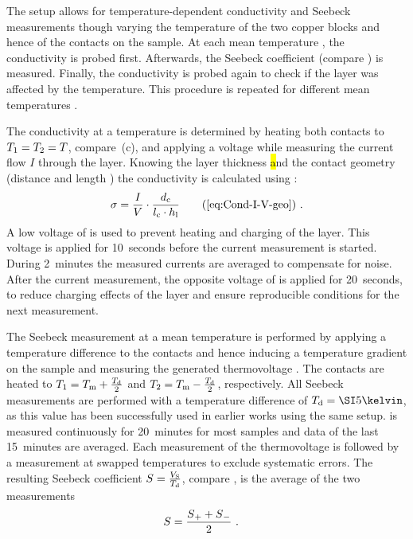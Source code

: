 The setup allows for temperature-dependent conductivity and Seebeck measurements though varying the temperature of the two copper blocks and hence of the contacts on the sample.
At each mean temperature \Tm, the conductivity is probed first. Afterwards, the Seebeck coefficient (compare ) is measured. Finally, the conductivity is probed again to check if the layer was affected by the temperature. This procedure is repeated for different mean temperatures \Tm.

The conductivity at a temperature \T is determined by heating both contacts to \mbox{$T_1=T_2=\T$}, compare \,(c), and applying a voltage \V while measuring the current flow $I$ through the layer. Knowing the layer thickness \hl and the contact geometry (distance \dc and length \lc) the conductivity is calculated using :
\begin{align}
\c = \frac{I}{V} \cdot \frac{\dc}{\lc\cdot\hl}
\tag{\ref{eq:Cond-I-V-geo}}
\PUNKT
\end{align}
A low voltage of \V[1] is used to prevent heating and charging of the layer. This voltage is applied for 10~seconds before the current measurement is started. During 2~minutes the measured currents are averaged to compensate for noise. After the current measurement, the opposite voltage of \V[-1] is applied for 20~seconds, to reduce charging effects of the layer and ensure reproducible conditions for the next measurement.

The Seebeck measurement at a mean temperature \Tm is performed by applying a temperature difference \Td to the contacts and hence inducing a temperature gradient on the sample and measuring the generated thermovoltage \Vs.
The contacts are heated to $T_1=\Tm+\frac{\Td}{2}$ and $T_2=\Tm-\frac{\Td}{2}$, respectively. All Seebeck measurements are performed with a temperature difference of $\Td=\K{5}$, as this value has been successfully used in earlier works using the same setup.
\Vs is measured continuously for 20~minutes for most samples and data of the last 15~minutes are averaged.
Each measurement of the thermovoltage is followed by a measurement at swapped temperatures to exclude systematic errors. The resulting Seebeck coefficient \mbox{$\S=\frac{\Vs}{\Td}$}, compare , is the average of the two measurements
\begin{align}
\S &= \frac{\S{}_++\S{}_-}{2}
\PUNKT
\end{align}

